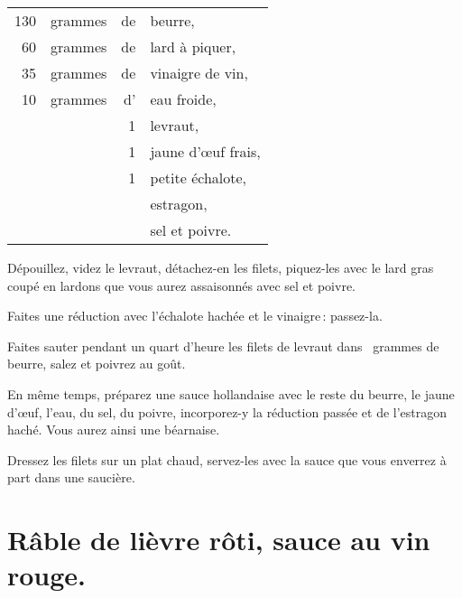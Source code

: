 \footnotesize
\begin{longtable}{rrrp{16em}}
    130 & grammes & de & beurre,                                                                          \\
     60 & grammes & de & lard à piquer,                                                                   \\
     35 & grammes & de & vinaigre de vin,                                                                 \\
     10 & grammes & d' & eau froide,                                                                      \\
        &         &  1 & levraut,                                                                         \\
        &         &  1 & jaune d'œuf frais,                                                               \\
        &         &  1 & petite échalote,                                                                 \\
        &         &    & estragon,                                                                        \\
        &         &    & sel et poivre.                                                                   \\
\end{longtable}
\normalsize

Dépouillez, videz le levraut, détachez-en les filets, piquez-les avec le lard gras
coupé en lardons que vous aurez assaisonnés avec sel et poivre.

Faites une réduction avec l'échalote hachée et le vinaigre : passez-la.

Faites sauter pendant un quart d'heure les filets de levraut dans
{\mmm} gram\-mes de beurre, salez et poivrez au goût.

En même temps, préparez une sauce hollandaise avec le reste du beurre, le jaune
d'œuf, l'eau, du sel, du poivre, incorporez-y la réduction passée et de
l'estragon haché. Vous aurez ainsi une béarnaise.

Dressez les filets sur un plat chaud, servez-les avec la sauce que vous enverrez
à part dans une saucière.

\section*{\centering Râble de lièvre rôti, sauce au vin rouge.}
{}

